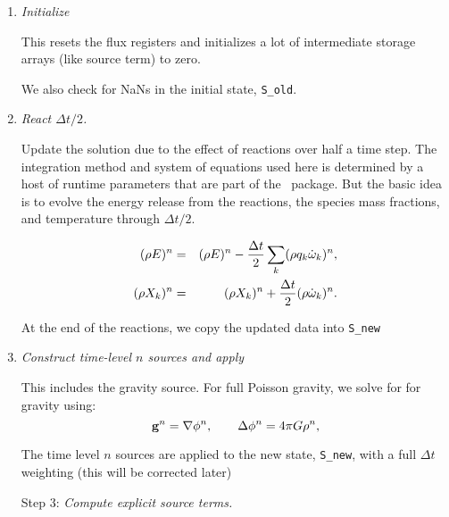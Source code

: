 \begin{enumerate}
\item {\em Initialize}

This resets the flux registers and initializes a lot of intermediate
storage arrays (like source term) to zero.

We also check for NaNs in the initial state, {\tt S\_old}.

\item {\em React $\Delta t/2$.}

Update the solution due to the effect of reactions over half a time
step.  The integration method and system of equations used here is
determined by a host of runtime parameters that are part of the
\microphysics\ package.  But the basic idea is to evolve the energy
release from the reactions, the species mass fractions, and temperature
through $\Delta t/2$.

\begin{eqnarray}
(\rho E)^n &=& (\rho E)^n - \frac{\Delta t}{2}\sum_k(\rho q_k\dot\omega_k)^n,\\
(\rho X_k)^n &=& (\rho X_k)^n + \frac{\Delta t}{2}(\rho\dot\omega_k)^n.
\end{eqnarray} 

At the end of the reactions, we copy the updated data into {\tt S\_new} 


\item {\em Construct time-level $n$ sources and apply}

This includes the gravity source.  For full Poisson gravity, we solve
for for gravity using:
\begin{equation}
{\bf g}^n = \nabla\phi^n, \qquad 
\Delta\phi^n = 4\pi G\rho^n,
\end{equation}

The time level $n$ sources are applied to the new state, {\tt S\_new},
with a full $\Delta t$ weighting (this will be corrected later)





\item[Step 3:] {\em Compute explicit source terms.}


\end{enumerate}
